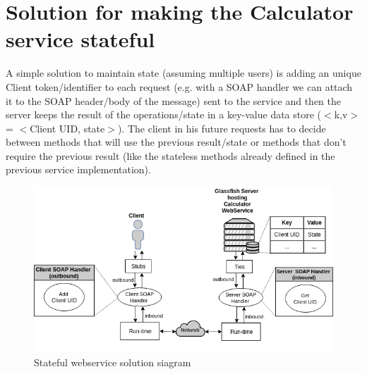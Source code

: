 \documentclass[a4paper]{article}
\begin{document}
\section*{Solution for making the Calculator service stateful}
A simple solution to maintain state (assuming multiple users) is adding an unique Client token/identifier to each request (e.g. with a SOAP handler we can attach it to the SOAP header/body of the message) sent to the service and then the server keeps the result of the operations/state in a key-value data store ($<$k,v$>$ = $<$Client UID, state$>$).  The client in his future requests has to decide between methods that will use the previous result/state or methods that don't require the previous result (like the stateless methods already defined in the previous service implementation).
\begin{figure}[h]
    \centering
    \includegraphics[scale=0.75]{assignment1-1}
    \caption{Stateful webservice solution siagram}
\end{figure}
\end{document}
